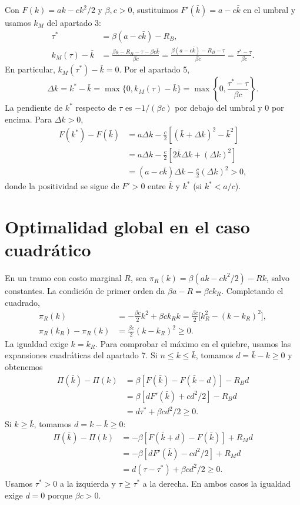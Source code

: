 \documentclass[11pt]{article}
\newcommand{\Rb}{R_B}
\newcommand{\Rm}{R_M}
\newcommand{\km}{k_M}
\begin{document}
Con $F(k)=ak-ck^2/2$ y $\beta,c>0$, sustituimos $F'(\bar k)=a-c\bar k$
en el umbral y usamos $\km$ del apartado 3:
\begin{align*}
\tau^*&=\beta(a-c\bar k)-\Rb,\\
\km(\tau)-\bar k
&=\frac{\beta a-\Rb-\tau-\beta c\bar k}{\beta c}
=\frac{\beta(a-c\bar k)-\Rb-\tau}{\beta c}
=\frac{\tau^*-\tau}{\beta c}.
\end{align*}
En particular, $\km(\tau^*)-\bar k=0$. Por el apartado 5,
\[
\Delta k=k^*-\bar k
=\max\{0,\km(\tau)-\bar k\}
=\max\left\{0,\frac{\tau^*-\tau}{\beta c}\right\}.
\]
La pendiente de $k^*$ respecto de $\tau$ es $-1/(\beta c)$ por debajo del
umbral y $0$ por encima. Para $\Delta k>0$,
\begin{align*}
F(k^*)-F(\bar k)
&=a\Delta k-\frac c2[(\bar k+\Delta k)^2-\bar k^2]\\
&=a\Delta k-\frac c2[2\bar k\Delta k+(\Delta k)^2]\\
&=(a-c\bar k)\Delta k-\frac c2(\Delta k)^2>0,
\end{align*}
donde la positividad se sigue de $F'>0$ entre $\bar k$ y $k^*$
(si $k^*<a/c$).

\section{Optimalidad global en el caso cuadrático}

En un tramo con costo marginal $R$, sea
$\pi_R(k)=\beta(ak-ck^2/2)-Rk$, salvo constantes. La condición de primer
orden da $\beta a-R=\beta c k_R$. Completando el cuadrado,
\begin{align*}
\pi_R(k)&=-\frac{\beta c}{2}k^2+\beta c k_R k
=\frac{\beta c}{2}\big[k_R^2-(k-k_R)^2\big],\\
\pi_R(k_R)-\pi_R(k)&=\frac{\beta c}{2}(k-k_R)^2\geq0.
\end{align*}
La igualdad exige $k=k_R$. Para comprobar el máximo en el quiebre, usamos
las expansiones cuadráticas del apartado 7. Si $n\leq k\leq\bar k$,
tomamos $d=\bar k-k\geq0$ y obtenemos
\begin{align*}
\Pi(\bar k)-\Pi(k)
&=\beta[F(\bar k)-F(\bar k-d)]-\Rb d\\
&=\beta[dF'(\bar k)+cd^2/2]-\Rb d\\
&=d\tau^*+\beta c d^2/2\geq0.
\end{align*}
Si $k\geq\bar k$, tomamos $d=k-\bar k\geq0$:
\begin{align*}
\Pi(\bar k)-\Pi(k)
&=-\beta[F(\bar k+d)-F(\bar k)]+\Rm d\\
&=-\beta[dF'(\bar k)-cd^2/2]+\Rm d\\
&=d(\tau-\tau^*)+\beta c d^2/2\geq0.
\end{align*}
Usamos $\tau^*>0$ a la izquierda y $\tau\geq\tau^*$ a la derecha.
En ambos casos la igualdad exige $d=0$ porque $\beta c>0$.
\end{document}

